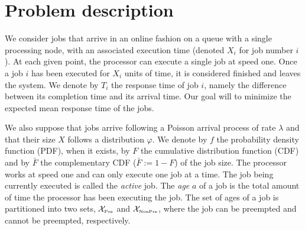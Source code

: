 \documentclass[11pt]{article}
\renewcommand{\phi}{\varphi}
\newcommand{\E}{\mathbb{E}}
\newcommand{\XP}{\mathcal{X}_{\mbox{\tiny Pre}}}
\newcommand{\XNP}{\mathcal{X}_{\mbox{\tiny NonPre}}}
\begin{document}
 \section{Problem description}
  


We consider jobs that arrive in an online fashion on a queue with a single processing node,
with  an associated execution time (denoted $X_i$ for job number $i$). At each given point, the processor
can execute a single job at speed one. Once a
job $i$ has been executed for  $X_i$ units of time, it is considered finished and leaves the system.
We denote by $T_i$ the response time of job $i$,  namely the difference between its completion time and its arrival time.  Our
goal will  to minimize the expected mean response time of the jobs.





We also suppose that jobs
arrive following a Poisson arrival process of rate $\lambda$ and that their
size $X$ follows a  distribution $\phi$. %
We denote by  $f$ the probability density  function (PDF), when it exists,  by  $F$ the cumulative distribution function (CDF) and by $\bar{F}$ the complementary  CDF ($\bar{F} := 1-F$) of the job size.
The processor works at speed one and can only execute one job at a time. The job being currently executed is called the {\it active}  job.
The {\it age} $a$ of a job is the total amount of time the processor has been executing the job.
The set of ages of a job is partitioned into two sets, $\XP$ and $\XNP$, where the job can be preempted and cannot be preempted, respectively.
\end{document}
